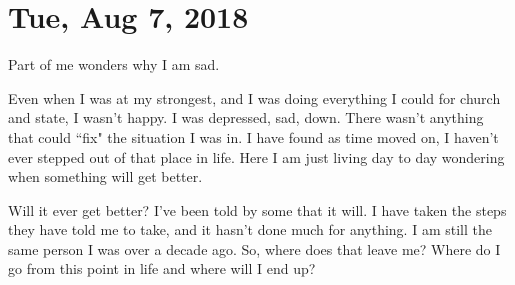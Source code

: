 \section{Tue, Aug 7, 2018}

\centerline{Part of me wonders why I am sad.}

Even when I was at my strongest, and I was doing everything I could for church and
state, I wasn't happy. I was depressed, sad, down. There wasn't anything that could
``fix" the situation I was in. I have found as time moved on, I haven't ever stepped
out of that place in life. Here I am just living day to day wondering when something
will get better.

Will it ever get better? I've been told by some that it will. I have taken the steps
they have told me to take, and it hasn't done much for anything. I am still the same
person I was over a decade ago. So, where does that leave me? Where do I go from this
point in life and where will I end up?